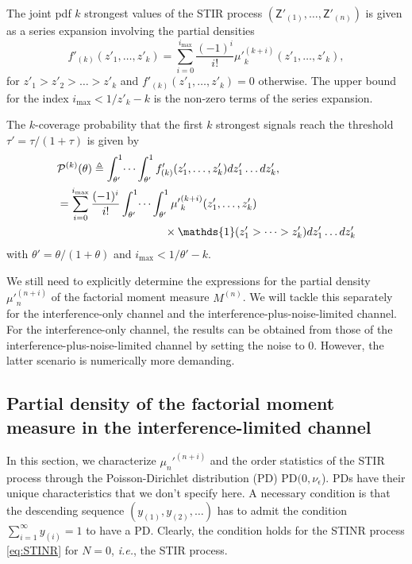 \documentclass[lettersize,journal]{IEEEtran}
\begin{document}
The joint pdf $k$ strongest values of the STIR process $(\mathsf{Z}'_{(1)}, \dots, \mathsf{Z}'_{(n)})$ is given as a series expansion involving the partial densities
\begin{equation}
  \label{eq:jointprobability}
  f'_{(k)}(z'_1,\dots,z'_k)= \sum^{i_{\text{max}}}_{i=0}\frac{(-1)^i}{i!}{\mu'}_k^{(k+i)}(z'_1,\dots,z'_k),
\end{equation}
for $z'_1>z'_2>\dots>z'_k$ and $f'_{(k)}(z'_1,\dots,z'_k) =0 $ otherwise. The upper bound for the index $i_{\text{max}}<1/z'_k-k$ is the non-zero terms of the series expansion.

The $k$-coverage probability that the first $k$ strongest signals reach the threshold $\tau' =\tau/(1+\tau)$ is given by
\begin{align}
  \label{eq:kprobability}
  &\mathcal{P}^{(k)}(\theta) \triangleq  \int_{\theta'}^1\dots \int_{\theta'}^1 f'_{(k)}({z'_1},\dots,{z'_k})dz'_1 \dots d{z'_k}, \nonumber\\
  &=\sum_{i=0}^{i_{\text{max}}}\frac{(-1)^i}{i!}\int_{\theta'}^1\dots \int_{\theta'}^1 {\mu'}_k^{(k+i)}(z'_1,\dots,z'_k) \nonumber\\
  &\hspace{3.4cm}\times\mathds{1}(z'_1>\dots>z'_k) dz'_1 \dots d{z'_k}
\end{align}
with $\theta'=\theta/(1+\theta)$ and $i_{\text{max}}<1/\theta'-k$.


We still need to explicitly determine the expressions for the partial density ${\mu'}_n^{(n+i)}$ of the factorial moment measure $M^{(n)}$. We will tackle this separately for the interference-only channel and the interference-plus-noise-limited channel. For the interference-only channel, the results can be obtained from those of the interference-plus-noise-limited channel by setting the noise to $0$. However, the latter scenario is numerically more demanding.


\subsection{Partial density of the factorial moment measure in the interference-limited channel}
In this section, we characterize $\mu_n'^{(n+i)}$ and the order statistics of the STIR process through the Poisson-Dirichlet distribution (PD)  $\text{PD}(0,\nu_{\epsilon}$). PDs have their unique characteristics that we don't specify here. A necessary condition is that the descending sequence  $(y_{(1)},y_{(2)},\dots)$ has to admit the condition $\sum_{i=1}^{\infty}y_{(i)}=1$ to have a PD. Clearly, the condition holds for the STINR process \eqref{eq:STINR} for $N=0$, \textit{i.e.}, the STIR process.
\end{document}
